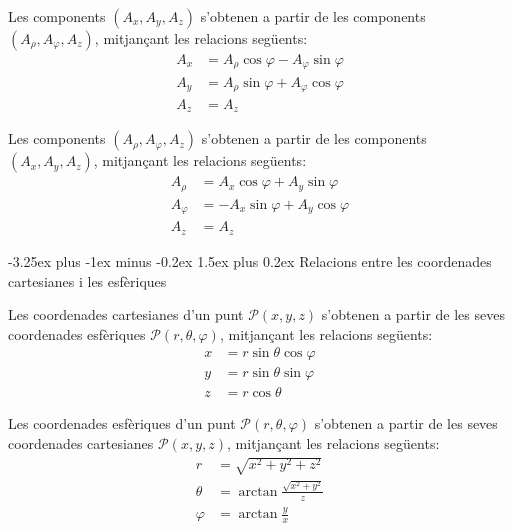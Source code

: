 \documentclass[catalan,a4paper,twoside,11pt]{article}
\makeatletter
\renewcommand{\subsection}{\@startsection {subsection}{2}{0pt}%
	{-3.25ex plus -1ex minus -0.2ex}%
	{1.5ex plus 0.2ex}%
	{\large  \sffamily  \bfseries}}
\makeatother
\begin{document}
Les components $(A_x, A_y, A_z)$  s'obtenen a partir de les  components  $(A_\rho, A_\varphi, A_z)$, mitjançant les relacions següents:
\begin{subequations}\begin{align}
    A_x &=A_\rho \cos\varphi -A_\varphi\sin\varphi \\
    A_y &=A_\rho\sin\varphi +A_\varphi\cos\varphi\\
    A_z &= A_z
\end{align}\end{subequations}

Les components  $(A_\rho, A_\varphi, A_z)$ s'obtenen a partir de les  components $(A_x, A_y, A_z)$, mitjançant les relacions següents:
\begin{subequations}\begin{align}
    A_\rho &=  A_x\cos\varphi+A_y\sin\varphi\\
    A_\varphi &= -A_x\sin\varphi+A_y\cos\varphi \\
    A_z &= A_z
\end{align}\end{subequations}


\subsection{Relacions entre les coordenades cartesianes i les esfèriques}

Les coordenades cartesianes  d'un punt $\mathscr{P}(x,y,z)$ s'obtenen a partir
de les seves coordenades esfèriques $\mathscr{P}(r,\theta,\varphi)$,
mitjançant les relacions següents:
\begin{subequations}\begin{align}
    x &=r\sin\theta\cos\varphi \\ y &=r\sin\theta\sin\varphi \\ z &=r\cos\theta
\end{align}\end{subequations}

Les coordenades  esfèriques  d'un punt $\mathscr{P}(r,\theta,\varphi)$
s'obtenen a partir de les seves coordenades cartesianes $\mathscr{P}(x,y,z)$,
mitjançant les relacions següents:
\begin{subequations}\begin{align}
    r &=\sqrt{x^2+y^2+z^2}\\
    \theta&=\arctan{\frac{\sqrt{x^2+y^2}}{z}}\\[1mm]
    \varphi &=\arctan\frac{y}{x}
\end{align}\end{subequations}
\end{document}
